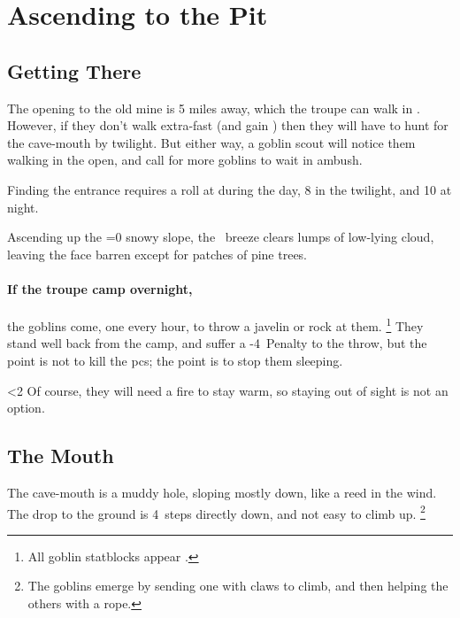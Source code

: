 \section{Ascending to the Pit}

\begin{multicols}{2}

\subsection{Getting There}

The opening to the old mine is 5 miles away, which the troupe can walk in .
However, if they don't walk extra-fast (and gain ) then they will have to hunt for the cave-mouth by twilight.
But either way, a goblin scout will notice them walking in the open, and call for more goblins to wait in ambush.

Finding the entrance requires a  roll at \tn[6] during the day, 8 in the twilight, and 10 at night.

\begin{boxtext}
  Ascending up the \ifnum\value{temperature}=0 snowy \fi slope, the \showTemperature\ breeze clears lumps of low-lying cloud, leaving the face barren except for patches of pine trees.
\end{boxtext}

\paragraph{If the troupe camp overnight,}
the goblins come, one every hour, to throw a javelin or rock at them.%
\footnote{All goblin statblocks appear .}
They stand well back from the camp, and suffer a -4~Penalty to the throw, but the point is not to kill the \glspl{pc}; the point is to stop them sleeping.

\ifnum\value{temperature}<2%
  Of course, they will need a fire to stay warm, so staying out of sight is not an option.
\fi

\playCommentaryCaveIn[t]

\subsection{The Mouth}

The cave-mouth is a muddy hole, sloping mostly down, like a reed in the wind.
The drop to the ground is 4~\glspl{step} directly down, and not easy to climb up.%
\footnote{The goblins emerge by sending one with claws to climb, and then helping the others with a rope.}


\end{multicols}

